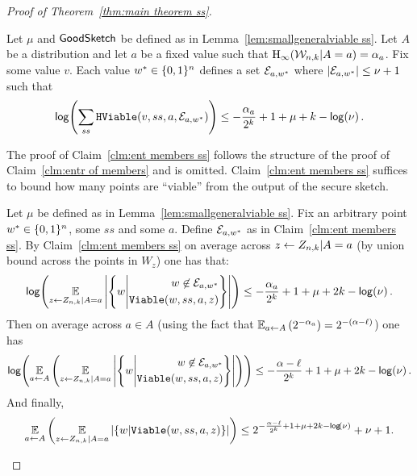 \begin{proof}[Proof of Theorem~\ref{thm:main theorem ss}]
\begin{claim}
Let $\mu$ and $\mathsf{GoodSketch}$ be defined as in Lemma~\ref{lem:smallgeneralviable ss}.
Let $A$ be a distribution and let $a$ be a fixed value such that $\mathrm{H}_\infty(\mathcal{W}_{n,k}|A=a) =\alpha_a$.  Fix some value $v$.  Each value $w^*\in\{0, 1\}^n$ defines a set $\mathcal{E}_{a, w^*}$ where $|\mathcal{E}_{a,w^*}| \le \nu+1$ such that
\begin{align*}
\mathsf{log}\!\left(\sum_{ss}\mathtt{HViable}(v,ss, a, \mathcal{E}_{a,w^*})\right)\le -\frac{\alpha_a}{2^k}+1+\mu+k-\mathsf{log}\!\left(\nu\right).
\end{align*}

\label{clm:ent members ss}
\end{claim}
The proof of Claim~\ref{clm:ent members ss} follows the structure of the proof of Claim~\ref{clm:entr of members} and is omitted. 
Claim~\ref{clm:ent members ss} suffices to bound how many points are ``viable'' from the output of the secure sketch.

\begin{corollary}
\label{corollary:info loss ss}
Let $\mu$ be defined as in Lemma~\ref{lem:smallgeneralviable ss}.  Fix an arbitrary point $w^*\in \{0, 1\}^n$, some $ss$ and some $a$. Define $\mathcal{E}_{a,w^*}$ as in Claim~\ref{clm:ent members ss}.  By Claim~\ref{clm:ent members ss} on average across $z\leftarrow Z_{n,k}| A=a$ (by union bound across the points in $W_z$) one has that:
\begin{align*}
\mathsf{log}\!\left(\operatorname*{\mathbb{E}}_{z\leftarrow Z_{n,k}| A=a} \left|\left\{ 
w\middle| \begin{aligned} w\not\in \mathcal{E}_{a, w^*} \\\mathtt{Viable}(w,ss, a, z)\end{aligned} \right\} \right|\right) \le -\frac{\alpha_a}{2^k}+1+\mu+2k-\mathsf{log}\!\left(\nu\right).
\end{align*}
Then on average across $a\in A$ (using the fact that $\operatorname*{\mathbb{E}}_{a\leftarrow A} \left(2^{-\alpha_a} \right) = 2^{-(\alpha-\ell)}$) one has 
\begin{align*}
\mathsf{log}\!\left(\operatorname*{\mathbb{E}}_{a\leftarrow A}\left(\operatorname*{\mathbb{E}}_{z\leftarrow Z_{n,k}| A=a} \left|\left\{ 
w\middle| \begin{aligned} w\not\in \mathcal{E}_{a, w^*} \\\mathtt{Viable}(w,ss, a, z)\end{aligned} \right\} \right| \right)\right)\le -\frac{\alpha-\ell}{2^k}+1+\mu+2k-\mathsf{log}\!\left(\nu\right).
\end{align*}
And finally, 
\begin{align*}
\operatorname*{\mathbb{E}}_{a\leftarrow A}\left(\operatorname*{\mathbb{E}}_{z\leftarrow Z_{n,k}| A=a} \left|\left\{ 
w\middle|\mathtt{Viable}(w, ss, a, z)\right\} \right| \right)\le 2^{-\frac{\alpha-\ell}{2^k}+1+\mu+2k-\mathsf{log}\!\left(\nu\right)}+\nu+1.
\end{align*}
\end{corollary}


\end{proof}
